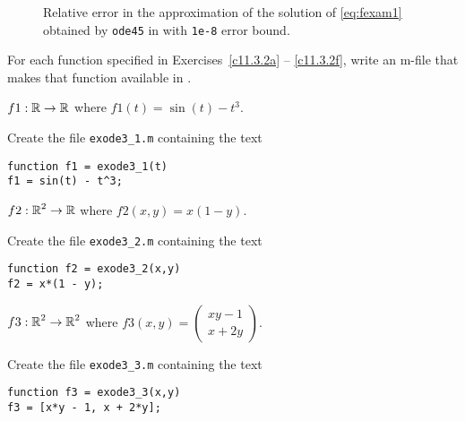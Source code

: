 \documentclass{ximera}
\begin{document}
\begin{figure}[htb]
   \centerline{%
   }
   \caption{Relative error in the approximation of the solution of
   \protect\eqref{eq:fexam1} obtained by {\tt ode45} in \protect\Matlab with 
	{\tt 1e-8} error bound.}
   \label{fig:ode45err2}
\end{figure}

\EXER

\CEXER

\noindent For each function specified in Exercises~\ref{c11.3.2a} -- 
\ref{c11.3.2f}, write an m-file that makes that function available in 
\Matlabp.
\begin{exercise} \label{c11.3.2a}
$f1:\mbox{$\Bbb{R}$}\to\mbox{$\Bbb{R}$}$ where $f1(t)=\sin(t) - t^3$.

\begin{solution}

Create the file {\tt exode3\_1.m} containing the text
\begin{verbatim}
function f1 = exode3_1(t)
f1 = sin(t) - t^3;
\end{verbatim}

\end{solution}
\end{exercise}
\begin{exercise} \label{c11.3.2b}
$f2:\mbox{$\Bbb{R}$}^2\to\mbox{$\Bbb{R}$}$ where $f2(x,y)=x(1-y)$.

\begin{solution}

Create the file {\tt exode3\_2.m} containing the text
\begin{verbatim}
function f2 = exode3_2(x,y)
f2 = x*(1 - y);
\end{verbatim}

\end{solution}
\end{exercise}
\begin{exercise} \label{c11.3.2c}
$f3:\mbox{$\Bbb{R}$}^2\to\mbox{$\Bbb{R}$}^2$ where  
$f3(x,y)=\left(\begin{array}{c} xy-1\\x+2y\end{array}\right)$.

\begin{solution}

Create the file {\tt exode3\_3.m} containing the text
\begin{verbatim}
function f3 = exode3_3(x,y)
f3 = [x*y - 1, x + 2*y];
\end{verbatim}

\end{solution}
\end{exercise}
\end{document}
